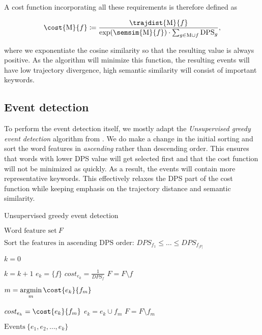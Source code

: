A cost function incorporating all these requirements is therefore defined as

\begin{equation} \label{eq:cost-function}
	\cost{\featset}{f} \coloneqq \frac{\trajdist{\featset}{f}}{\exp(\semsim{\featset}{f}) \cdot \sum_{g \in \featset \cup f}{\text{DPS}_{g}}},
\end{equation}

where we exponentiate the cosine similarity so that the resulting value is always positive. As the algorithm will minimize this function, the resulting events will have low trajectory divergence, high semantic similarity will consist of important keywords.


\subsection{Event detection}
To perform the event detection itself, we mostly adapt the \textit{Unsupervised greedy event detection} algorithm from \cite{event-detection}. We do make a change in the initial sorting and sort the word features in \textit{ascending} rather than descending order. This ensures that words with lower DPS value will get selected first and that the cost function will not be minimized as quickly. As a result, the events will contain more representative keywords. This effectively relaxes the DPS part of the cost function while keeping emphasis on the trajectory distance and semantic similarity.

\begin{algorithm}[H] \label{alg:greedy-event-detection}
\begin{algorithmic}[1]
\caption{Unsupervised greedy event detection}
\Input $\text{Word feature set} ~ F$

\State $\text{Sort the features in ascending DPS order: } DPS_{f_{1}} \leq \dots \leq DPS_{f_{\left\vert F \right\vert}}$

\State $k = 0$

	\State $k = k + 1$	
	\State $e_{k} = \{ f \}$
	\State $cost_{e_{k}} = \frac{1}{DPS_{f}}$
	\State $F = F \setminus f$
	
		\State $m = \argmin\limits_{m}{\cost{e_{k}}{f_{m}}}$

			\State $cost_{e_{k}} = \cost{e_{k}}{f_{m}}$
			\State $e_{k} = e_{k} \cup f_{m}$
			\State $F = F \setminus f_{m}$
		\Else
			\Break
		\EndIf
	\EndWhile
\EndFor

\Output $\text{Events} ~ \{ e_{1}, e_{2}, \dots, e_{k} \}$
\end{algorithmic}
\end{algorithm}


